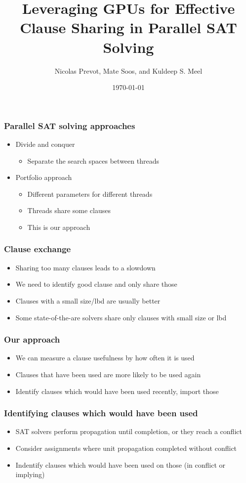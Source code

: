 \documentclass{beamer}
\title{Leveraging GPUs for Effective Clause Sharing in Parallel SAT Solving}
\author{Nicolas Prevot, Mate Soos, and Kuldeep S. Meel}
\date{\today}
\begin{document}
\begin{frame}
\titlepage
\end{frame}

\begin{frame}
\frametitle{Parallel SAT solving approaches}
\begin{itemize}
\item Divide and conquer
\begin{itemize}
\item Separate the search spaces between threads
\end{itemize}
\item Portfolio approach
\begin{itemize}
\item Different parameters for different threads
\item Threads share some clauses
\item This is our approach
\end{itemize}
\end{itemize}
\end{frame}

\begin{frame}
\frametitle{Clause exchange}
\begin{itemize}
\item Sharing too many clauses leads to a slowdown
\item We need to identify good clause and only share those
\item Clauses with a small size/lbd are usually better
\item Some state-of-the-are solvers share only clauses with small size or lbd
\end{itemize}
\end{frame}

\begin{frame}
\frametitle{Our approach}
\begin{itemize}
\item We can measure a clause usefulness by how often it is used
\item Clauses that have been used are more likely to be used again
\item Identify clauses which would have been used recently, import those
\end{itemize}
\end{frame}

\begin{frame}
\frametitle{Identifying clauses which would have been used}
\begin{itemize}
\item SAT solvers perform propagation until completion, or they reach a conflict
\item Consider assignments where unit propagation completed without conflict
\item Indentify clauses which would have been used on those (in conflict or implying)
\end{itemize}
\end{frame}
\end{document}
